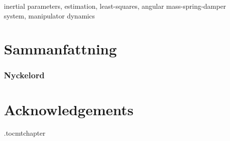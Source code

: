 \documentclass[/home/francois/latex/report/main.tex]{subfiles}
\begin{document}
inertial parameters, estimation, least-squares, angular mass-spring-damper system, manipulator dynamics

\newpage
\thispagestyle{plain}
\chapter*{Sammanfattning}


\subsection*{Nyckelord}


\newpage
\thispagestyle{plain}
\chapter*{Acknowledgements}


\newpage



\newpage

\etocdepthtag.toc{mtchapter}
\thispagestyle{plain}
\tableofcontents

\newpage
\end{document}
